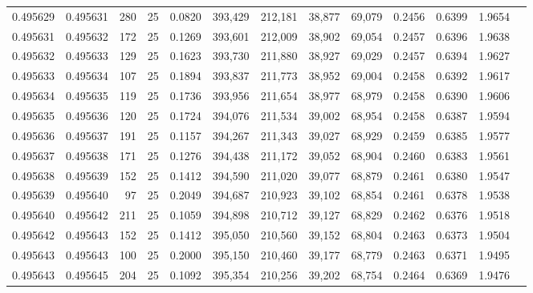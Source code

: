 \begin{tabular}{rrrrrrrrrrrrr}
0.495629 & 0.495631 &   280 &  25 &                                     0.0820 & 393,429 & 212,181 &  38,877 &  69,079 & 0.2456 & 0.6399 & 1.9654 \\
0.495631 & 0.495632 &   172 &  25 &                                     0.1269 & 393,601 & 212,009 &  38,902 &  69,054 & 0.2457 & 0.6396 & 1.9638 \\
0.495632 & 0.495633 &   129 &  25 &                                     0.1623 & 393,730 & 211,880 &  38,927 &  69,029 & 0.2457 & 0.6394 & 1.9627 \\
0.495633 & 0.495634 &   107 &  25 &                                     0.1894 & 393,837 & 211,773 &  38,952 &  69,004 & 0.2458 & 0.6392 & 1.9617 \\
0.495634 & 0.495635 &   119 &  25 &                                     0.1736 & 393,956 & 211,654 &  38,977 &  68,979 & 0.2458 & 0.6390 & 1.9606 \\
0.495635 & 0.495636 &   120 &  25 &                                     0.1724 & 394,076 & 211,534 &  39,002 &  68,954 & 0.2458 & 0.6387 & 1.9594 \\
0.495636 & 0.495637 &   191 &  25 &                                     0.1157 & 394,267 & 211,343 &  39,027 &  68,929 & 0.2459 & 0.6385 & 1.9577 \\
0.495637 & 0.495638 &   171 &  25 &                                     0.1276 & 394,438 & 211,172 &  39,052 &  68,904 & 0.2460 & 0.6383 & 1.9561 \\
0.495638 & 0.495639 &   152 &  25 &                                     0.1412 & 394,590 & 211,020 &  39,077 &  68,879 & 0.2461 & 0.6380 & 1.9547 \\
0.495639 & 0.495640 &    97 &  25 &                                     0.2049 & 394,687 & 210,923 &  39,102 &  68,854 & 0.2461 & 0.6378 & 1.9538 \\
0.495640 & 0.495642 &   211 &  25 &                                     0.1059 & 394,898 & 210,712 &  39,127 &  68,829 & 0.2462 & 0.6376 & 1.9518 \\
0.495642 & 0.495643 &   152 &  25 &                                     0.1412 & 395,050 & 210,560 &  39,152 &  68,804 & 0.2463 & 0.6373 & 1.9504 \\
0.495643 & 0.495643 &   100 &  25 &                                     0.2000 & 395,150 & 210,460 &  39,177 &  68,779 & 0.2463 & 0.6371 & 1.9495 \\
0.495643 & 0.495645 &   204 &  25 &                                     0.1092 & 395,354 & 210,256 &  39,202 &  68,754 & 0.2464 & 0.6369 & 1.9476 \\

\end{tabular}

